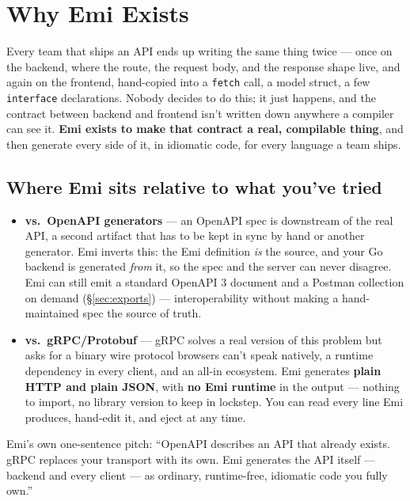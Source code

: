 \section{Why Emi Exists}
\label{sec:overview}

Every team that ships an API ends up writing the same thing twice --- once
on the backend, where the route, the request body, and the response shape
live, and again on the frontend, hand-copied into a \texttt{fetch} call, a
model struct, a few \texttt{interface} declarations. Nobody decides to do
this; it just happens, and the contract between backend and frontend
isn't written down anywhere a compiler can see it. \textbf{Emi exists to
make that contract a real, compilable thing}, and then generate every side
of it, in idiomatic code, for every language a team ships.

\subsection{Where Emi sits relative to what you've tried}
\begin{itemize}[leftmargin=1.1em,itemsep=2pt,topsep=2pt]
  \item \textbf{vs.\ OpenAPI generators} --- an OpenAPI spec is downstream
        of the real API, a second artifact that has to be kept in sync by
        hand or another generator. Emi inverts this: the Emi definition
        \emph{is} the source, and your Go backend is generated \emph{from}
        it, so the spec and the server can never disagree. Emi can still
        emit a standard OpenAPI 3 document and a Postman collection on
        demand (\S\ref{sec:exports}) --- interoperability without making a
        hand-maintained spec the source of truth.
  \item \textbf{vs.\ gRPC/Protobuf} --- gRPC solves a real version of this
        problem but asks for a binary wire protocol browsers can't speak
        natively, a runtime dependency in every client, and an all-in
        ecosystem. Emi generates \textbf{plain HTTP and plain JSON}, with
        \textbf{no Emi runtime} in the output --- nothing to import, no
        library version to keep in lockstep. You can read every line Emi
        produces, hand-edit it, and eject at any time.
\end{itemize}

\begin{pullquote}
Emi's own one-sentence pitch: ``OpenAPI describes an API that already
exists. gRPC replaces your transport with its own. Emi generates the API
itself --- backend and every client --- as ordinary, runtime-free,
idiomatic code you fully own.''
\end{pullquote}

